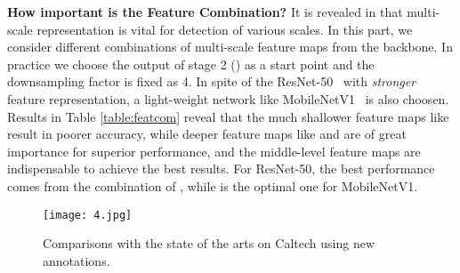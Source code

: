 \documentclass[review]{elsarticle}
\begin{document}
\textbf{How important is the Feature Combination?}
It is revealed in \cite{Song_2018_ECCV} that multi-scale representation is vital for detection of various scales. In this part, we consider different combinations of multi-scale feature maps from the backbone. In practice we choose the output of stage 2 () as a start point and the downsampling factor  is fixed as 4. In spite of the ResNet-50~\cite{he2016deep} with \emph{stronger} feature representation, a light-weight network like MobileNetV1~\cite{howard2017mobilenets} is also choosen. Results in Table \ref{table:featcom} reveal that the much shallower feature maps like  result in poorer accuracy, while deeper feature maps like  and  are of great importance for superior performance, and the middle-level feature maps  are indispensable to achieve the best results. For ResNet-50, the best performance comes from the combination of , while  is the optimal one for MobileNetV1.


\begin{figure*}[t]
\begin{center}
\texttt{[image: 4.jpg]}
\end{center}
   \caption{Comparisons with the state of the arts on Caltech using new annotations.}
\label{fig:cal}
\end{figure*}
\end{document}
